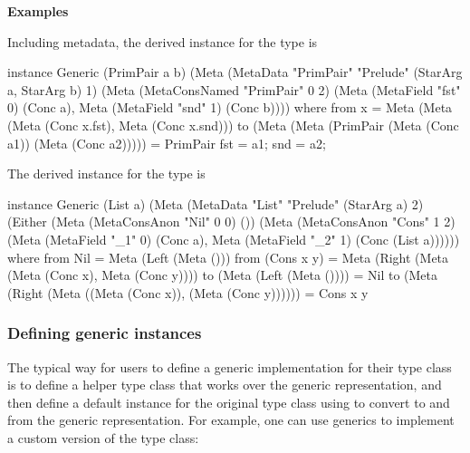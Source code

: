 {\bf Examples}

Including metadata, the derived  instance for the  type is

\begin{libverbatim}
   instance Generic (PrimPair a b)
      (Meta (MetaData "PrimPair" "Prelude" (StarArg a, StarArg b) 1)
      (Meta (MetaConsNamed "PrimPair" 0 2)
      (Meta (MetaField "fst" 0) (Conc a),
         Meta (MetaField "snd" 1) (Conc b)))) where
   from x = Meta (Meta (Meta (Conc x.fst), Meta (Conc x.snd)))
   to (Meta (Meta (PrimPair (Meta (Conc a1)) (Meta (Conc a2))))) = 
      PrimPair { fst = a1; snd = a2; }
\end{libverbatim}

The derived  instance for the  type is

\begin{libverbatim}
   instance Generic (List a)
      (Meta (MetaData "List" "Prelude" (StarArg a) 2)
      (Either (Meta (MetaConsAnon "Nil" 0 0) ())
      (Meta (MetaConsAnon "Cons" 1 2)
         (Meta (MetaField "_1" 0) (Conc a),
         Meta (MetaField "_2" 1) (Conc (List a)))))) where
   from Nil = Meta (Left (Meta ()))
   from (Cons x y) =
      Meta (Right (Meta (Meta (Conc x), Meta (Conc y))))
   to (Meta (Left (Meta ()))) = Nil
   to (Meta (Right (Meta ((Meta (Conc x)), (Meta (Conc y)))))) = Cons x y
\end{libverbatim}

\subsubsection{Defining generic instances}

The typical way for users to define a generic implementation for their type class is to define a helper type class
that works over the generic representation, and then define a default instance for the original type class
using  to convert to and from the generic representation.  
For example, one can use generics to implement a custom version of the  type class:

